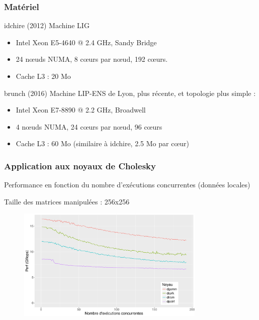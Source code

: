 \documentclass[xcolor={usenames,dvipsnames,svgnames,table}, aspectratio=43]{beamer}
\begin{document}
\begin{frame}
  \frametitle{Matériel}

  \begin{block}{idchire (2012)}
    Machine LIG
    \begin{itemize}
      \item Intel Xeon E5-4640 @ 2.4 GHz, Sandy Bridge
      \item 24 nœuds NUMA, 8 cœurs par nœud, 192 cœurs.
      \item Cache L3 : 20 Mo
    \end{itemize}
  \end{block}

  \begin{block}{brunch (2016)}
    Machine LIP-ENS de Lyon, plus récente, et topologie plus simple :
    \begin{itemize}
      \item Intel Xeon E7-8890 @ 2.2 GHz, Broadwell
      \item 4 nœuds NUMA, 24 cœurs par nœud, 96 cœurs
      \item Cache L3 : 60 Mo (similaire à idchire, 2.5 Mo par cœur)
    \end{itemize}
  \end{block}

\end{frame}



\begin{frame}
\frametitle{Application aux noyaux de Cholesky}

Performance en fonction du nombre d'exécutions concurrentes (données locales)

Taille des matrices manipulées : 256x256
\begin{figure}
  \centering
  \includegraphics[width=0.8\textwidth]{graph/kernel_256_local_idchire.pdf}
\end{figure}

\end{frame}
\end{document}
